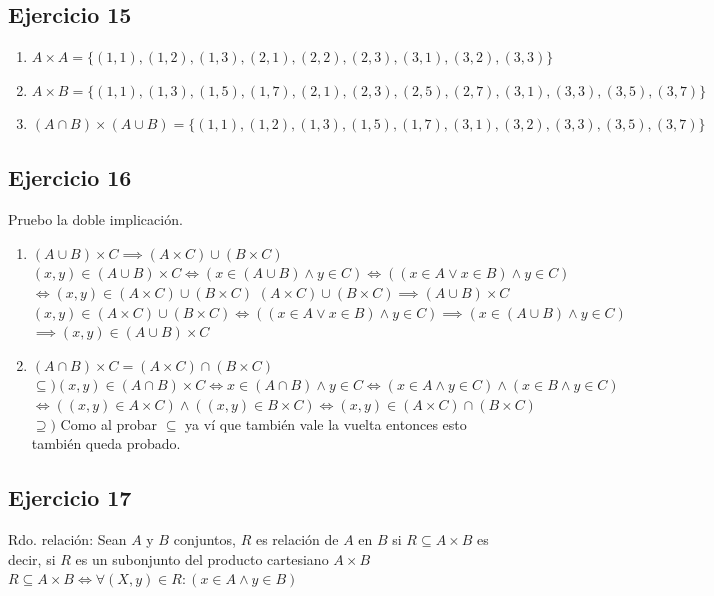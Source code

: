 \subsection{Ejercicio 15}
\begin{enumerate}
    \item $A \times A = \{(1,1),(1,2),(1,3),(2,1),(2,2),(2,3),(3,1),(3,2),(3,3)\}$
    \item $A \times B = \{(1,1),(1,3),(1,5),(1,7),(2,1),(2,3),(2,5),(2,7),(3,1),(3,3),(3,5),(3,7)\}$
    \item $(A\cap B) \times (A\cup B) = \{(1,1),(1,2),(1,3),(1,5),(1,7),(3,1),(3,2),(3,3),(3,5),(3,7)\}$
\end{enumerate}

\subsection{Ejercicio 16}
Pruebo la doble implicación. 
\begin{enumerate}[label=(\alph*)]
    \item
        $(A \cup B) \times C \implies (A \times C) \cup (B \times C)$\\
        $(x, y) \in (A\cup B) \times C \iff (x \in (A\cup B) \wedge y \in C) \iff ((x \in A \vee x \in B) \wedge y \in C)$\\
        $\iff (x,y) \in (A\times C) \cup (B \times C)$
        $(A \times C) \cup (B \times C) \implies (A \cup B) \times C$\\
        
        $(x,y) \in (A \times C) \cup (B \times C) \iff ((x \in A \vee x \in B) \wedge y\in C) \implies (x\in (A \cup B) \wedge y \in C)$\\
        $\implies (x, y) \in (A \cup B) \times C$ 
    \item
		$(A \cap B) \times C = (A \times C) \cap (B \times C)$\\
		$\subseteq) (x,y) \in (A \cap B) \times C \iff x \in (A \cap B) \wedge y \in C \iff (x \in A \wedge y \in C) \wedge (x \in B \wedge y\in C)$\\
		$\iff ((x,y) \in A \times C) \wedge ((x,y)\in B \times C) \iff (x,y) \in (A \times C) \cap (B \times C)$\\
		
		$\supseteq)$ Como al probar $\subseteq$ ya ví que también vale la vuelta entonces esto también queda probado.
\end{enumerate}

\subsection{Ejercicio 17}
Rdo. relación: Sean $A$ y $B$ conjuntos, $R$ es relación de $A$ en $B$ si $R \subseteq A\times B$ es decir, si $R$ es un subonjunto del producto cartesiano $A \times B$\\
$R \subseteq A \times B \iff \forall (X,y) \in R : (x \in A \wedge y \in B)$

